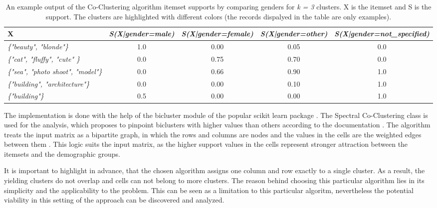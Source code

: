     \begin{table}[H]
        \centering
        \begin{adjustbox}{width=1\textwidth}
            \begin{tabular}{l|c|c|c|c}
                X & \emph{S(X|gender=male)} & \emph{S(X|gender=female)} & \emph{S(X|gender=other)} & \emph{S(X|gender=not\_specified)} \\
                \hline
                \emph{\{"beauty", "blonde"\}} & \cellcolor{blue!25}1.0 &  0.00 &  0.05 &  0.0 \\
                \emph{\{"cat", "fluffy", "cute" \}} &  0.0 & \cellcolor{red!25}0.75 & \cellcolor{red!25}0.70 &  0.0 \\
                \emph{\{"sea", "photo shoot", "model"\}} &  0.0 & \cellcolor{red!25}0.66 & \cellcolor{red!25}0.90 & \cellcolor{green!25}1.0 \\
                \emph{\{"building", "architecture"\}} &  0.0 &  0.00 &  0.10 & \cellcolor{green!25}1.0 \\
                \emph{\{"building"\}} &  0.5 &  0.00 &  0.00 & \cellcolor{green!25}1.0
            \end{tabular}
        \end{adjustbox}
        \caption{An example output of the Co-Clustering algorithm itemset supports by comparing genders for \emph{k = 3} clusters. X is the itemset and S is the support. The clusters are highlighted with different colors (the records dispalyed in the table are only examples).}
        \label{coclustering_output_format}
    \end{table}
    
    The implementation is done with the help of the bicluster module \cite{scikit-bicluster} of the popular scikit learn package \cite{scikit-learn}. The Spectral Co-Clustering class is used for the analysis, which proposes to pinpoint biclusters with higher values than others according to the documentation \cite{scikit-bicluster}. The algorithm treats the input matrix as a bipartite graph, in which the rows and columns are nodes and the values in the cells are the weighted edges between them \cite{scikit-bicluster}. This logic suits the input matrix, as the higher support values in the cells represent stronger attraction between the itemsets and the demographic groups.

    It is important to highlight in advance, that the chosen algorithm assigns one column and row exactly to a single cluster. As a result, the yielding clusters do not overlap and cells can not belong to more clusters. The reason behind choosing this particular algorithm lies in its simplicity and the applicability to the problem. This can be seen as a limitation to this particular algoritm, nevertheless the potential viability in this setting of the approach can be discovered and analyzed. 

